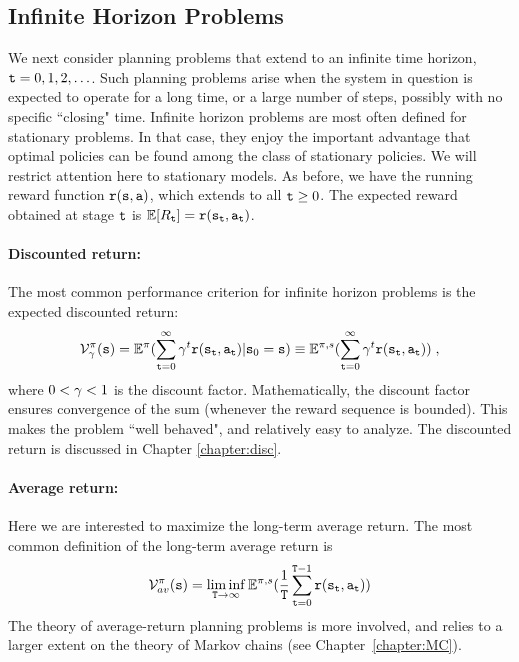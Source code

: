 \subsection{Infinite Horizon Problems}
We next consider planning problems that extend to an infinite time
horizon, ${\tt t} = 0,1,2, \ldots $. Such planning problems arise
when the system in question is expected to operate for a long time,
or a large number of steps, possibly with no specific ``closing"
time. Infinite horizon problems are most often defined for
stationary problems. In that case, they enjoy the important
advantage that optimal policies can be found among the class of
stationary policies.  We will restrict attention here to stationary
models. As before, we have the running reward function
${\tt r}({\tt s},{\tt a})$, which extends to all ${\tt t}\ge 0$. The
expected reward obtained at stage ${\tt t}$ is $\mathbb{E}[{R_{\tt t}}] =
{\tt r}({{\tt s}_{\tt t}},{{\tt a}_{\tt t}})$.

\paragraph{Discounted return:} The most common performance criterion for infinite horizon problems is the expected discounted return:
\[\mathcal{V}_\gamma ^\pi ({\tt s}) = {\mathbb{E}^\pi }(\sum\limits_{{\tt t} = 0}^\infty  {{\gamma^t}{\tt r}({{\tt s}_{\tt t}},{{\tt a}_{\tt t}})} |{{\tt s}_0} = {\tt s}) \equiv {\ensuremath{\mathbb{E}}^{\pi,s}}(\sum\limits_{{\tt t} = 0}^\infty  {{\gamma^t}{\tt r}({{\tt s}_{\tt t}},{{\tt a}_{\tt t}})} )\;,\]
where $0 < \gamma  < 1$ is the discount factor. Mathematically,
the discount factor ensures convergence of the sum (whenever the
reward sequence is bounded). This makes the problem ``well behaved",
and relatively easy to analyze. The discounted return is discussed
in Chapter \ref{chapter:disc}.

\paragraph{Average return:}  Here we are interested to maximize the long-term average return. The most common definition of the long-term average return is
\[\mathcal{V}_{av}^\pi ({\tt s}) = \mathop {\lim \inf }\limits_{{\tt T} \to \infty } {\mathbb{E}^{\pi ,s}}(\frac{1}{{\tt T}}\sum\limits_{{\tt t} = 0}^{{\tt T} -1} {{\tt r}({{\tt s}_{\tt t}},{{\tt a}_{\tt t}})} )\]
The theory of average-return planning problems is more involved, and
relies to a larger extent on the theory of Markov chains (see
Chapter~\ref{chapter:MC}). 



